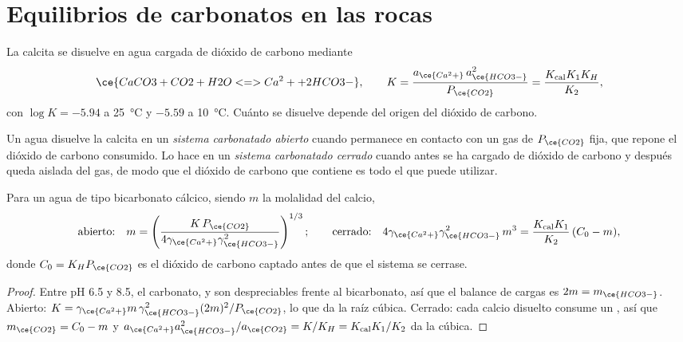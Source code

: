 \section{Equilibrios de carbonatos en las rocas}\label{sec:b3:water-rock-interaction:carbonate}

La calcita se disuelve en agua cargada de dióxido de carbono mediante
\[
\ce{CaCO3 + CO2 + H2O <=> Ca^2+ + 2 HCO3-},
\qquad K = \frac{a_{\ce{Ca^2+}}\,a_{\ce{HCO3-}}^2}{P_{\ce{CO2}}}
= \frac{K_{\mathrm{cal}}K_1K_H}{K_2},
\]
con $\log K = -5.94$ a \qty{25}{\celsius} y $-5.59$ a \qty{10}{\celsius}.
Cuánto se disuelve depende del origen del dióxido de carbono.

\begin{definition}\label{def:b3:water-rock-interaction:open-closed}
Un agua disuelve la calcita en un \emph{sistema carbonatado abierto}
cuando permanece en contacto con un gas de
$P_{\ce{CO2}}$ fija, que repone el dióxido de carbono consumido. Lo hace en un
\emph{sistema carbonatado cerrado} cuando antes se ha cargado de dióxido de carbono
y después queda aislada del gas, de modo que
el dióxido de carbono que contiene es todo el que puede utilizar.
\end{definition}

\begin{theorem}\label{thm:b3:water-rock-interaction:calcite}
Para un agua de tipo bicarbonato cálcico, siendo $m$ la molalidad del calcio,
\[
\text{abierto:}\quad m = \left(\frac{K\,P_{\ce{CO2}}}{4\gamma_{\ce{Ca^2+}}
\gamma_{\ce{HCO3-}}^2}\right)^{1/3};
\qquad
\text{cerrado:}\quad 4\gamma_{\ce{Ca^2+}}\gamma_{\ce{HCO3-}}^2\,m^3 =
\frac{K_{\mathrm{cal}}K_1}{K_2}\,(C_0 - m),
\]
donde $C_0 = K_H P_{\ce{CO2}}$ es el dióxido de carbono captado antes de que el
sistema se cerrase.
\end{theorem}

\begin{proof}
Entre pH 6.5 y 8.5, el carbonato,  y  son despreciables frente al
bicarbonato, así que el balance de cargas es $2m = m_{\ce{HCO3-}}$. Abierto: $K = \gamma
_{\ce{Ca^2+}}m\,\gamma_{\ce{HCO3-}}^2(2m)^2/P_{\ce{CO2}}$, lo que da la
raíz cúbica. Cerrado: cada calcio disuelto consume un , así que $m_{\ce{CO2}}
= C_0 - m$ y $a_{\ce{Ca^2+}}a_{\ce{HCO3-}}^2/a_{\ce{CO2}} = K/K_H =
K_{\mathrm{cal}}K_1/K_2$ da la cúbica.
\end{proof}

